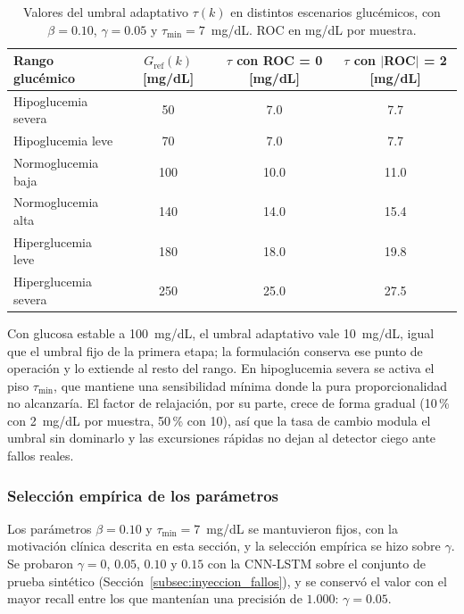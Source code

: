 \documentclass{report}
\begin{document}
\begin{table}[h]
    \centering
    \caption{Valores del umbral adaptativo $\tau(k)$ en distintos escenarios glucémicos, con $\beta = 0.10$, $\gamma = 0.05$ y $\tau_{\min} = 7$~mg/dL. ROC en mg/dL por muestra.}
    \label{tab:umbral_rangos}
    \begin{tabular}{lccc}
        \toprule
        \textbf{Rango glucémico} & $G_{\mathrm{ref}}(k)$ \textbf{[mg/dL]} & $\tau$ \textbf{con ROC = 0 [mg/dL]} & $\tau$ \textbf{con $|$ROC$|$ = 2 [mg/dL]} \\
        \midrule
        Hipoglucemia severa  & 50  & 7.0  & 7.7  \\
        Hipoglucemia leve    & 70  & 7.0  & 7.7  \\
        Normoglucemia baja   & 100 & 10.0 & 11.0 \\
        Normoglucemia alta   & 140 & 14.0 & 15.4 \\
        Hiperglucemia leve   & 180 & 18.0 & 19.8 \\
        Hiperglucemia severa & 250 & 25.0 & 27.5 \\
        \bottomrule
    \end{tabular}
\end{table}

Con glucosa estable a 100~mg/dL, el umbral adaptativo vale 10~mg/dL, igual que el umbral fijo de la primera etapa; la formulación conserva ese punto de operación y lo extiende al resto del rango. En hipoglucemia severa se activa el piso $\tau_{\min}$, que mantiene una sensibilidad mínima donde la pura proporcionalidad no alcanzaría. El factor de relajación, por su parte, crece de forma gradual (10\,\% con 2~mg/dL por muestra, 50\,\% con 10), así que la tasa de cambio modula el umbral sin dominarlo y las excursiones rápidas no dejan al detector ciego ante fallos reales.

\subsubsection{Selección empírica de los parámetros}
\label{subsec:seleccion_parametros}

Los parámetros $\beta = 0.10$ y $\tau_{\min} = 7$~mg/dL se mantuvieron fijos, con la motivación clínica descrita en esta sección, y la selección empírica se hizo sobre $\gamma$. Se probaron $\gamma = 0$, $0.05$, $0.10$ y $0.15$ con la CNN-LSTM sobre el conjunto de prueba sintético (Sección~\ref{subsec:inyeccion_fallos}), y se conservó el valor con el mayor recall entre los que mantenían una precisión de $1.000$: $\gamma = 0.05$.
\end{document}
